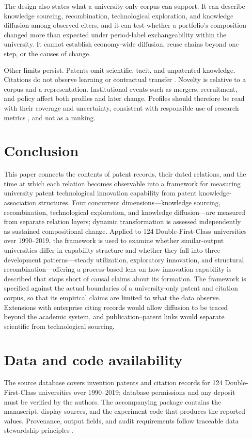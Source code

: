 The design also states what a university-only corpus can support. It can
describe knowledge sourcing, recombination, technological exploration, and
knowledge diffusion among observed citers, and it can test whether a
portfolio's composition changed more than expected under period-label
exchangeability within the university. It cannot establish economy-wide
diffusion, reuse chains beyond one step, or the
causes of change.

Other limits persist. Patents omit scientific, tacit, and unpatented knowledge.
Citations do not observe learning or contractual transfer \citep{alcacer2006}.
Novelty is relative to a corpus and a representation. Institutional events
such as mergers, recruitment, and policy affect both profiles and later change.
Profiles should therefore be read with their coverage and uncertainty,
consistent with responsible use of research metrics \citep{hicks2015}, and not
as a ranking.

\section{Conclusion}\label{sec:conclusion}
This paper connects the contents of patent records, their dated relations, and
the time at which each relation becomes observable into a framework for
measuring university patent technological innovation capability from patent
knowledge-association structures. Four concurrent dimensions---knowledge
sourcing, recombination, technological exploration, and knowledge
diffusion---are measured from separate relation layers; dynamic transformation
is assessed independently as sustained compositional change. Applied to 124
Double-First-Class universities over 1990--2019, the framework is used to examine whether
similar-output universities differ in capability structure and whether they
fall into three development patterns---steady utilization, exploratory
innovation, and structural recombination---offering a process-based lens on
how innovation capability is described that stops short of causal claims
about its formation. The framework is specified against the actual boundaries of
a university-only patent and citation corpus, so that its empirical claims are
limited to what the data observe. Extensions with enterprise citing records
would allow diffusion to be traced beyond the academic system, and
publication--patent links would separate scientific from technological
sourcing.

\section*{Data and code availability}
The source database covers invention patents and citation records for 124
Double-First-Class universities over 1990--2019; database permissions and any
deposit must be verified by the authors. The accompanying package contains the
manuscript, display sources, and the experiment code that produces the reported
values. Provenance, output fields, and audit requirements follow traceable
data stewardship principles \citep{wilkinson2016}.
